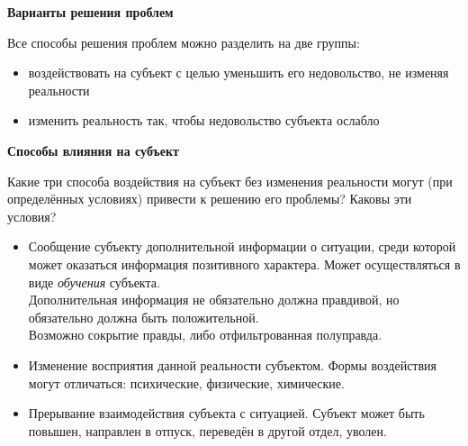 \documentclass{article}
\newcommand{\note}[1]{\textit{#1}}
\renewcommand{\subsection}[1]{
	\vspace{2em}
	\begin{flushright}
		\large
		\textbf{#1}
	\end{flushright}
	}
\begin{document}
\subsection{Варианты решения проблем}
Все способы решения проблем можно разделить на две группы:
\begin{itemize}
	\item воздействовать на субъект с целью уменьшить его недовольство, не изменяя реальности
	\item изменить реальность так, чтобы недовольство субъекта ослабло
\end{itemize}
\subsection{Способы влияния на субъект}
Какие три способа воздействия на субъект без изменения реальности могут (при определённых условиях) привести к решению его проблемы? Каковы эти условия?
\begin{itemize}
	\item Сообщение субъекту дополнительной информации о ситуации, среди которой может оказаться информация позитивного характера. Может осуществляться в виде \note{обучения} субъекта.\\Дополнительная информация не обязательно должна правдивой, но обязательно должна быть положительной.\\Возможно сокрытие правды, либо отфильтрованная полуправда.
	\item Изменение восприятия данной реальности субъектом. Формы воздействия могут отличаться: психические, физические, химические.
	\item Прерывание взаимодействия субъекта с ситуацией. Субъект может быть повышен, направлен в отпуск, переведён в другой отдел, уволен.
\end{itemize}
\end{document}
